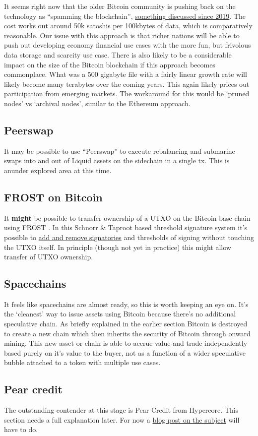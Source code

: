 It seems right now that the older Bitcoin community is pushing back on the technology as ``spamming the blockchain'', \href{https://lists.linuxfoundation.org/pipermail/bitcoin-dev/2019-September/017306.html}{something discussed since 2019}. The cost works out around 50k satoshis per 100kbytes of data, which is comparatively reasonable. Our issue with this approach is that richer nations will be able to push out developing economy financial use cases with the more fun, but frivolous data storage and scarcity use case. There is also likely to be a considerable impact on the size of the Bitcoin blockchain if this approach becomes commonplace. What was a 500 gigabyte file with a fairly linear growth rate will likely become many terabytes over the coming years. This again likely prices out participation from emerging markets. The workaround for this would be `pruned nodes' vs `archival nodes', similar to the Ethereum approach.\par 
\subsection{Peerswap}
It may be possible to use ``Peerswap'' to execute rebalancing and submarine swaps into and out of Liquid assets on the sidechain in a single tx. This is anunder explored area at this time.
\subsection{FROST on Bitcoin}
It \textbf{might} be possible to transfer ownership of a UTXO on the Bitcoin base chain using FROST \cite{komlo2020frost}. In this Schnorr \& Taproot based threshold signature system it's possible to \href{https://btctranscripts.com/sydney-bitcoin-meetup/2022-03-29-socratic-seminar/}{add and remove signatories} and thresholds of signing without touching the UTXO itself. In principle (though not yet in practice) this might allow transfer of UTXO ownership. 
\subsection{Spacechains}
It feels like spacechains are almost ready, so this is worth keeping an eye on. It's the `cleanest' way to issue assets using Bitcoin because there's no additional speculative chain. As briefly explained in the earlier section Bitcoin is destroyed to create a new chain which then inherits the security of Bitcoin through onward mining. This new asset or chain is able to accrue value and trade independently based purely on it's value to the buyer, not as a function of a wider speculative bubble attached to a token with multiple use cases.
\subsection{Pear credit}
The outstanding contender at this stage is Pear Credit from Hypercore. This section needs a full explanation later. For now a \href{https://medium.com/@observer1/tether-announced-the-launch-of-pear-credit-8d4f66ccd97b}{blog post on the subject} will have to do.
